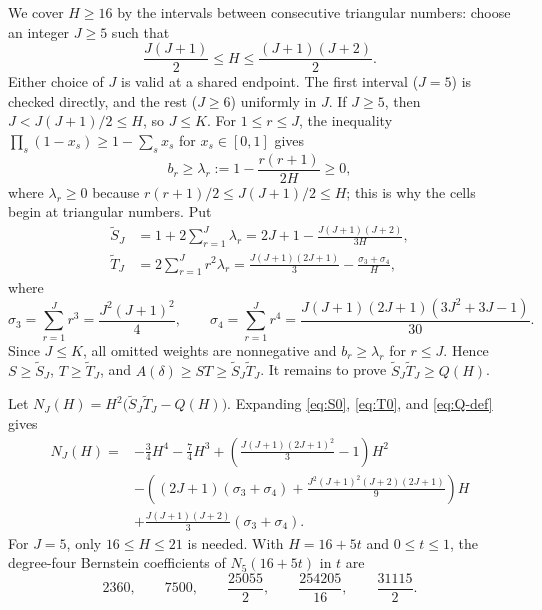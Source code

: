 \documentclass[ECP]{ejpecp}
\begin{document}
We cover $H\geq16$ by the intervals between consecutive triangular numbers:
choose an integer $J\geq5$ such that
\begin{equation}\label{eq:triangular-cell}
  \frac{J(J+1)}2\leq H\leq\frac{(J+1)(J+2)}2.
\end{equation}
Either choice of $J$ is valid at a shared endpoint. The first interval
($J=5$) is checked directly, and the rest ($J\geq6$) uniformly in $J$. If
$J\geq5$, then $J<J(J+1)/2\leq H$, so $J\leq K$. For $1\leq r\leq J$, the
inequality $\prod_s(1-x_s)\geq1-\sum_sx_s$ for $x_s\in[0,1]$ gives
\begin{equation}\label{eq:bonferroni}
  b_r\geq\lambda_r:=1-\frac{r(r+1)}{2H}\geq0,
\end{equation}
where $\lambda_r\geq0$ because $r(r+1)/2\leq J(J+1)/2\leq H$; this is why
the cells begin at triangular numbers.
Put
\begin{align}
  \tilde S_J&=1+2\sum_{r=1}^J \lambda_r
  =2J+1-\frac{J(J+1)(J+2)}{3H},
  \label{eq:S0}\\
  \tilde T_J&=2\sum_{r=1}^Jr^2\lambda_r
  =\frac{J(J+1)(2J+1)}3-\frac{\sigma_3+\sigma_4}{H},
  \label{eq:T0}
\end{align}
where
\[
  \sigma_3=\sum_{r=1}^Jr^3=\frac{J^2(J+1)^2}{4},
  \qquad
  \sigma_4=\sum_{r=1}^Jr^4=\frac{J(J+1)(2J+1)(3J^2+3J-1)}{30}.
\]
Since $J\leq K$, all omitted weights are nonnegative and $b_r\geq\lambda_r$
for $r\leq J$. Hence $S\geq\tilde S_J$, $T\geq\tilde T_J$, and
$A(\delta)\geq ST\geq\tilde S_J\tilde T_J$. It remains to prove
$\tilde S_J\tilde T_J\geq Q(H)$.

Let $N_J(H)=H^2\bigl(\tilde S_J\tilde T_J-Q(H)\bigr)$. Expanding
\eqref{eq:S0}, \eqref{eq:T0}, and \eqref{eq:Q-def} gives
\begin{align*}
  N_J(H)={}&-\frac34H^4-\frac74H^3
  +\left(\frac{J(J+1)(2J+1)^2}{3}-1\right)H^2\\
  &-\left((2J+1)(\sigma_3+\sigma_4)
    +\frac{J^2(J+1)^2(J+2)(2J+1)}{9}\right)H\\
  &+\frac{J(J+1)(J+2)}{3}(\sigma_3+\sigma_4).
\end{align*}
For $J=5$, only $16\leq H\leq21$ is needed. With $H=16+5t$ and
$0\leq t\leq1$, the degree-four Bernstein coefficients of $N_5(16+5t)$ in $t$
are
\[
  2360,\qquad 7500,\qquad \frac{25055}{2},\qquad
  \frac{254205}{16},\qquad \frac{31115}{2}.
\]
\end{document}
